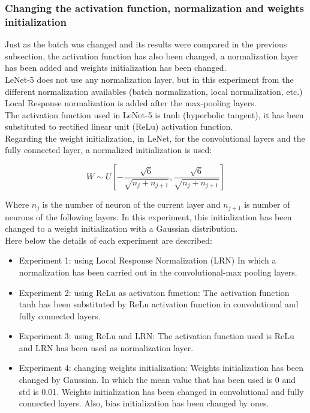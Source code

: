 \subsubsection{Changing the activation function, normalization and weights initialization}
Just as the batch was changed and its results were compared in the previous subsection, the activation function has also been changed, a normalization layer has been added and weights initialization has been changed.\\

LeNet-5 does not use any normalization layer, but in this experiment from the different normalization availables (batch normalization, local normalization, etc.) Local Response normalization is added after the max-pooling layers.\\

The activation function used in LeNet-5 is tanh (hyperbolic tangent), it has been substituted to rectified linear unit (ReLu) activation function.\\

Regarding the weight initialization, in LeNet, for the convolutional layers and the fully connected layer,  a normalized initialization \cite{XavierInitialization} is used:

\begin{equation}
  W \sim U [- \frac{\sqrt{6}}{\sqrt{n_{j}+n_{j+1}}},\frac{\sqrt{6}}{\sqrt{n_{j}+n_{j+1}}}]
\end{equation}

Where $n_{j}$ is the number of neuron of the current layer and $n_{j+1}$ is number of neurons of the following layers. In this experiment, this initialization has been changed to a weight initialization with a Gaussian distribution.\\

Here below the details of each experiment are described:
\begin{itemize}
\item{Experiment 1: using Local Response Normalization (LRN) In which a normalization has been carried out in the convolutional-max pooling layers.}
\item{Experiment 2: using ReLu as activation function:} The activation function tanh has been substituted by ReLu activation function in convolutional and fully connected layers.
\item{Experiment 3: using ReLu and LRN}: The activation function used is ReLu and LRN has been used as  normalization layer.
\item{Experiment 4: changing weights initialization}: Weights initialization has been changed by Gaussian. In which the mean value that has been used is 0 and std is 0.01. Weights initialization has been changed in convolutional and fully connected layers. Also, bias initialization has been changed by ones.
\end{itemize}

